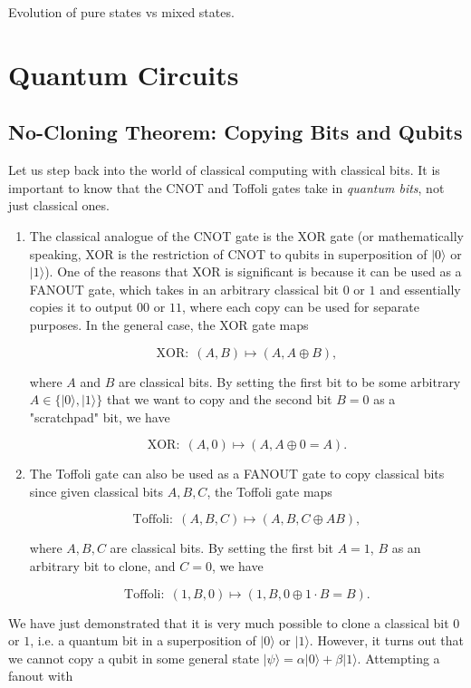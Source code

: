 \documentclass{article}
\theoremstyle{definition}
\begin{document}
  Evolution of pure states vs mixed states.




\section{Quantum Circuits}

  \subsection{No-Cloning Theorem: Copying Bits and Qubits}

    Let us step back into the world of classical computing with classical bits. It is important to know that the CNOT and Toffoli gates take in \textit{quantum bits}, not just classical ones.

    \begin{enumerate}
      \item The classical analogue of the CNOT gate is the XOR gate (or mathematically speaking, XOR is the restriction of CNOT to qubits in superposition of $|0\rangle$ or $|1\rangle$). One of the reasons that XOR is significant is because it can be used as a FANOUT gate, which takes in an arbitrary classical bit $0$ or $1$ and essentially copies it to output $00$ or $11$, where each copy can be used for separate purposes. In the general case, the XOR gate maps

        \[\text{XOR}: \; (A, B) \mapsto (A, A \oplus B),\]

      where $A$ and $B$ are classical bits. By setting the first bit to be some arbitrary $A \in \{|0\rangle, |1\rangle\}$ that we want to copy and the second bit $B = 0$ as a "scratchpad" bit, we have 

        \[\text{XOR}: \; (A, 0) \mapsto (A, A \oplus 0 = A).\]

      \item The Toffoli gate can also be used as a FANOUT gate to copy classical bits since given classical bits $A, B, C$, the Toffoli gate maps 

        \[\text{Toffoli}: \; (A, B, C) \mapsto (A, B, C \oplus A B),\]

      where $A, B, C$ are classical bits. By setting the first bit $A = 1$, $B$ as an arbitrary bit to clone, and $C=0$, we have 

        \[\text{Toffoli}: \; (1, B, 0) \mapsto (1, B, 0 \oplus 1\cdot B = B).\]
    \end{enumerate}

    We have just demonstrated that it is very much possible to clone a classical bit $0$ or $1$, i.e. a quantum bit in a superposition of $|0\rangle$ or $|1\rangle$. However, it turns out that we cannot copy a qubit in some general state $|\psi\rangle = \alpha |0\rangle + \beta |1\rangle$. Attempting a fanout with
\end{document}
